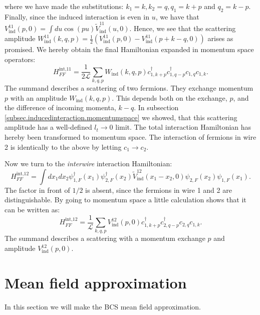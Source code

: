 where we have made the substitutions: $k_1 = k, k_2 = q, q_1 = k + p$ and $q_2 = k - p$. Finally, since the induced interaction is even in $u$, we have that $V^{11}_{\text{ind}}(p, 0) = \int du \cos(pu) \tilde{V}^{11}_{\text{ind}}(u, 0)$. Hence, we see that the scattering amplitude $W^{11}_{\text{ind}}(k, q, p) = \frac{1}{2}\left(V^{11}_\text{ind}\left( p, 0 \right) - V^{11}_\text{ind}\left( p + k - q, 0 \right) \right)$ arises as promised. We hereby obtain the final Hamiltonian expanded in momentum space operators:
\begin{equation}
H^\text{int,11}_{FF} = \frac{1}{2\mathcal{L}} \sum_{k,q,p} W_{\text{ind}}(k, q, p) c^\dagger_{1, k + p} c^\dagger_{1, q - p} c_{1, q} c_{1, k}. 
\label{eq.H11intMomentumSpace}
\end{equation}
The summand describes a scattering of two fermions. They exchange momentum $p$ with an amplitude $W_{\text{ind}}(k, q, p)$. This depends both on the exchange, $p$, and the difference of incoming momenta, $k - q$. In subsection \ref{subsec.inducedinteraction.momentumspace} we showed, that this scattering amplitude has a well-defined $l_t \to 0$ limit. The total interaction Hamiltonian has hereby been transformed to momentum space. The interaction of fermions in wire 2 is identically to the above by letting $c_1 \to c_2$.  

Now we turn to the \textit{interwire} interaction Hamiltonian:
\begin{equation}
H^\text{int,12}_{FF} = \int dx_1 dx_2 \psi^\dagger_{1,F}(x_1)\psi^\dagger_{2,F}(x_2) \tilde{V}_{\text{ind}}^{12}(x_1 - x_2,0) \psi_{2,F}(x_2)\psi_{1,F}(x_1).
\label{eq.Hint12realspace}
\end{equation}
The factor in front of $1/2$ is absent, since the fermions in wire 1 and 2 are distinguishable. By going to momentum space a little calculation shows that it can be written as:
\begin{equation}
H^\text{int,12}_{FF} = \frac{1}{\mathcal{L}}\sum_{k,q,p} V_{\text{ind}}^{12}(p, 0) c^\dagger_{1,k + p} c^\dagger_{2, q - p} c_{2, q} c_{1, k}. 
\label{eq.Hint12momentumspace}
\end{equation}
The summand describes a scattering with a momentum exchange $p$ and amplitude $V_{\text{ind}}^{12}(p,0)$. 

\section{Mean field approximation} \label{sec.meanfieldapproximation}
In this section we will make the BCS mean field approximation. 

